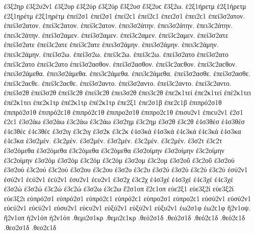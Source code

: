 {ἐ3ξ2ηρ   %
ἐ3ξ2υ2ν1   %
ἐ3ξ2υρ   %
ἐ3ξ2ύρ ἐ3ξ2ύρ   %
ἔ3ξ2υσ ἔ3ξ2υϲ   %
ἔ3ξ2ω. 
ἑ2ξ1ήρετμ ἑ2ξ1ήρετμ   %
ἑ2ξ1ηρέτμ ἑ2ξ1ηρέτμ 
ἐπεί2σ1 ἐπεί2σ1 ἐπεί2ϲ1 ἐπεί2ϲ1   %
ἐπει2σ1 ἐπει2ϲ1 
ἐπεί3σ2ατον. ἐπεί3σ2ατον. ἐπεί3ϲ2ατον. ἐπεί3ϲ2ατον.   %
ἐπει3σ2άτην. ἐπει3σ2άτην. ἐπει3ϲ2άτην. ἐπει3ϲ2άτην. 
ἐπεί3σ2αμεν. ἐπεί3σ2αμεν. ἐπεί3ϲ2αμεν. ἐπεί3ϲ2αμεν. 
ἐπεί3σ2ατε ἐπεί3σ2ατε ἐπεί3ϲ2ατε ἐπεί3ϲ2ατε 
ἐπει3σ2άμην. ἐπει3σ2άμην. ἐπει3ϲ2άμην. ἐπει3ϲ2άμην. 
ἐπεί3σ2ω. ἐπεί3σ2ω. ἐπεί3ϲ2ω. ἐπεί3ϲ2ω. 
ἐπεί3σ2ατο ἐπεί3σ2ατο ἐπεί3ϲ2ατο ἐπεί3ϲ2ατο 
ἐπεί3σ2ασθον. ἐπεί3σ2ασθον. ἐπεί3ϲ2αϲθον. ἐπεί3ϲ2αϲθον. 
ἐπει3σ2άμεθα. ἐπει3σ2άμεθα. ἐπει3ϲ2άμεθα. ἐπει3ϲ2άμεθα. 
ἐπεί3σ2ασθε. ἐπεί3σ2ασθε. ἐπεί3ϲ2αϲθε. ἐπεί3ϲ2αϲθε. 
ἐπεί3σ2αντο. ἐπεί3σ2αντο. ἐπεί3ϲ2αντο. ἐπεί3ϲ2αντο. 
ἐπεί3σ2θ ἐπεί3σ2θ ἐπεί3ϲ2θ ἐπεί3ϲ2θ   %
ἐπει3σ2θ ἐπει3ϲ2θ 
ἐπε2κ1τεί ἐπε2κ1τεί   %
ἐπέ2κ1τει ἐπέ2κ1τει 
ἐπε2κ1τρ   %
ἐπέ2κ1τρ ἐπέ2κ1τρ 
ἐπε2ξ1 
ἐπε2σ1β ἐπε2ϲ1β   %
ἐπιπρό2σ1θ ἐπιπρό2σ1θ ἐπιπρό2ϲ1θ ἐπιπρό2ϲ1θ   %
ἐπιπρο2σ1θ ἐπιπρο2ϲ1θ 
ἐπισυ2ν1 ἐπιϲυ2ν1   %
ἐ2σ1 ἐ2ϲ1 
ἐ3σ2άω ἐ3σ2άω ἐ3ϲ2άω ἐ3ϲ2άω   %
ἐ3σ2ημ ἐ3ϲ2ημ   %
ἐ3σ2θ ἐ3ϲ2θ   %
ἐ4σ3θέσ ἐ4σ3θέσ ἐ4ϲ3θέϲ ἐ4ϲ3θέϲ   %
ἐ3σ2ιγ ἐ3ϲ2ιγ   %
ἐ3σ2κ ἐ3ϲ2κ 
ἐ4σ3κά ἐ4σ3κά ἐ4ϲ3κά ἐ4ϲ3κά   %
ἐ4σ3κα ἐ4ϲ3κα   %
%
ἐ3σ2μὲν. ἐ3ϲ2μὲν. ἐ3σ2μέν. ἐ3σ2μέν. ἐ3ϲ2μέν. ἐ3ϲ2μέν.   %
ἐ3σ2τ ἐ3ϲ2τ 
ἐ3σ2όμεθα ἐ3σ2όμεθα ἐ3ϲ2όμεθα ἐ3ϲ2όμεθα 
ἐ3σ2οίμην ἐ3σ2οίμην ἐ3ϲ2οίμην ἐ3ϲ2οίμην 
ἐ3σ2όμ ἐ3σ2όμ ἐ3ϲ2όμ ἐ3ϲ2όμ   %
ἐ3σ2ομ ἐ3ϲ2ομ 
ἐ3σ2οῦ ἐ3ϲ2οῦ   %
ἐ3σ2ού ἐ3σ2ού ἐ3ϲ2ού ἐ3ϲ2ού   %
ἐ3σ2ου ἐ3ϲ2ου   %
%
ἐ3σ2υ ἐ3ϲ2υ   %
ἐ3σ2ύ ἐ3σ2ύ ἐ3ϲ2ύ ἐ3ϲ2ύ 
ἐσύ2ν1 ἐσύ2ν1 ἐϲύ2ν1 ἐϲύ2ν1   %
ἐσυ2ν1 ἐϲυ2ν1 
ἐ3σ2χ ἐ3ϲ2χ 
ἐ4σ3χέ ἐ4σ3χέ ἐ4ϲ3χέ ἐ4ϲ3χέ   %
ἐ3σ2ώ ἐ3σ2ώ ἐ3ϲ2ώ ἐ3ϲ2ώ 
ἐ3σ2ω ἐ3ϲ2ω 
ἔ2σ1οπ ἔ2ϲ1οπ   %
εὐε2ξ1   %
εὐε3ξ2ί εὐε3ξ2ί   %
εὐε3ξ2ι 
εὐπρό2σ1 εὐπρό2σ1 εὐπρό2ϲ1 εὐπρό2ϲ1   %
εὐπρο2σ1 εὐπρο2ϲ1 
εὐσύ2ν1 εὐσύ2ν1 εὐϲύ2ν1 εὐϲύ2ν1   %
εὐσυ2ν1 εὐϲυ2ν1 
εὐξύ2ν1 εὐξύ2ν1   %
εὐξυ2ν1 
ἐω2σ1φ ἐω2ϲ1φ   %
ἤ2ν1οψ.   %
ἤ2ν1οπ 
ἠ2ν1όπ ἠ2ν1όπ 
.θεμι2σ1κρ .θεμι2ϲ1κρ   %
.θεό2σ1δ .θεό2σ1δ .θεό2ϲ1δ .θεό2ϲ1δ   %
.θεο2σ1δ .θεο2ϲ1δ 
}
